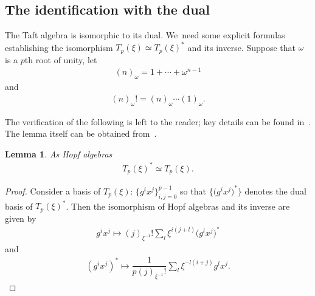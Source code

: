 \documentclass[11pt]{article}
\numberwithin{equation}{section}
\numberwithin{equation}{section}
\newtheorem{Lemma}[Theorem]{Lemma}
\begin{document}
\subsection{The identification with the dual}
The Taft algebra is isomorphic to its dual. We~need some explicit formulas establishing the isomorphism $T_p(\xi)\simeq T_p(\xi)^*$ and its inverse. Suppose that $\omega$ is a $p$th root of unity, let
\begin{gather}
(n)_\omega=1+\cdots +\omega^{n-1}
\end{gather}
and
\begin{gather}
(n)_\omega !=(n)_\omega\cdots(1)_\omega.
\end{gather}

The verification of the following is left to the reader; key details can be found in~\cite{selfdual}. The lemma itself can be obtained from~\cite{nen}.
\begin{Lemma}\label{nenlem}
 As Hopf algebras
 \begin{gather}
 T_p(\xi)^*\simeq T_p(\xi).
 \end{gather}
\end{Lemma}
\begin{proof}
Consider a basis of $T_p(\xi)$: $\big\{g^ix^j\big\}_{ i,j=0}^{p-1}$ so that $\big\{\big(g^ix^j\big)^*\big\}$ denotes the dual basis of $T_p(\xi)^*$. Then the isomorphism of Hopf algebras and its inverse are given by
\begin{gather}
g^ix^j\mapsto(j)_{\xi^{-1}}!\sum_l\xi^{i(j+l)}\big(g^lx^j\big)^*
\end{gather}
and
\begin{gather}
(g^ix^j)^*\mapsto\dfrac{1}{p(j)_{\xi^{-1}}!}\sum_l\xi^{-l(i+j)}g^lx^j.
\end{gather}
\end{proof}
\end{document}
